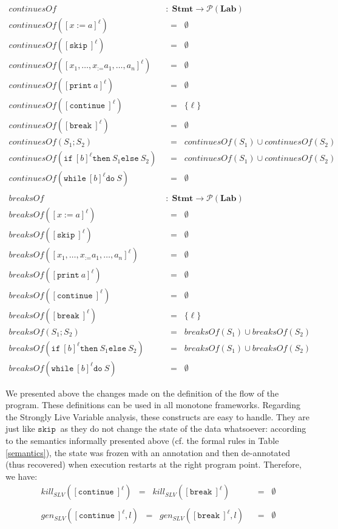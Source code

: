 \documentclass[a4wide,12pt]{article}
\def\eq{\;\; = \;\;}
\def\pset#1{\mathcal{P}(#1)}
\def\Stmt {\mathbf{Stmt}}
\def\Lab {\mathbf{Lab}}
\def\skip {\texttt{skip}\ }
\def\while{\texttt{while}\ }
\def\do {\texttt{do}\ }
\def\ifl {\texttt{if}\ }
\def\thenl {\texttt{then}\ }
\def\elsel {\texttt{else}\ }
\def\print{\texttt{print}\ }
\def\cont {\texttt{continue}\ }
\def\breakc{\texttt{break}\ }
\begin{document}
\begin{align*}
continuesOf & \; : \; \Stmt \to \pset{\Lab} \\
continuesOf([x:=a]^\ell) & \eq \emptyset \\
continuesOf([\skip]^\ell) & \eq \emptyset \\
continuesOf([x_1,\ldots,x_:=a_1,\ldots,a_n]^\ell) & \eq \emptyset \\
continuesOf([\print a]^\ell) & \eq \emptyset \\
continuesOf([\cont]^\ell) & \eq \{\ell\} \\
continuesOf([\breakc]^\ell) & \eq \emptyset \\
continuesOf(S_1;S_2) & \eq continuesOf(S_1) \cup continuesOf(S_2) \\
continuesOf(\ifl [b]^\ell \thenl S_1 \elsel S_2) & \eq continuesOf(S_1) \cup continuesOf(S_2) \\
continuesOf(\while [b]^\ell \do S) & \eq \emptyset \\
\\
breaksOf & \; : \; \Stmt \to \pset{\Lab} \\
breaksOf([x:=a]^\ell) & \eq \emptyset \\
breaksOf([\skip]^\ell) & \eq \emptyset \\
breaksOf([x_1,\ldots,x_:=a_1,\ldots,a_n]^\ell) & \eq \emptyset \\
breaksOf([\print a]^\ell) & \eq \emptyset \\
breaksOf([\cont]^\ell) & \eq \emptyset \\
breaksOf([\breakc]^\ell) & \eq \{\ell\} \\
breaksOf(S_1;S_2) & \eq breaksOf(S_1) \cup breaksOf(S_2) \\
breaksOf(\ifl [b]^\ell \thenl S_1 \elsel S_2) & \eq breaksOf(S_1) \cup breaksOf(S_2) \\
breaksOf(\while [b]^\ell \do S) & \eq \emptyset
\end{align*}
 
We presented above the changes made on the definition of the flow of the program.
These definitions can be used in all monotone frameworks. Regarding
the Strongly Live Variable analysis, these constructs are easy to handle. They
are just like $\skip$ as they do not change the state of the data whatsoever: according to the
semantics informally presented above (cf. the formal rules in
Table \ref{semantics}), the state was frozen with an annotation and then de-annotated (thus recovered)
when execution restarts at the right program point. Therefore, we have:
\begin{align*}
kill_{SLV}([\cont]^\ell) \eq kill_{SLV}([\breakc]^\ell) & \eq \emptyset \\
\\
gen_{SLV} ([\cont]^\ell,l) \eq gen_{SLV} ([\breakc]^\ell,l) & \eq \emptyset
\end{align*}
 
\end{document}
